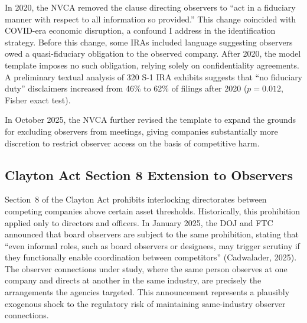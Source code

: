 In 2020, the NVCA removed the clause directing observers to ``act in a fiduciary manner with respect to all information so provided.'' This change coincided with COVID-era economic disruption, a confound I address in the identification strategy. Before this change, some IRAs included language suggesting observers owed a quasi-fiduciary obligation to the observed company. After 2020, the model template imposes no such obligation, relying solely on confidentiality agreements. A preliminary textual analysis of 320 S-1 IRA exhibits suggests that ``no fiduciary duty'' disclaimers increased from 46\% to 62\% of filings after 2020 ($p=0.012$, Fisher exact test).

In October 2025, the NVCA further revised the template to expand the grounds for excluding observers from meetings, giving companies substantially more discretion to restrict observer access on the basis of competitive harm.

\subsection{Clayton Act Section 8 Extension to Observers}

Section~8 of the Clayton Act prohibits interlocking directorates between competing companies above certain asset thresholds. Historically, this prohibition applied only to directors and officers. In January 2025, the DOJ and FTC announced that board observers are subject to the same prohibition, stating that ``even informal roles, such as board observers or designees, may trigger scrutiny if they functionally enable coordination between competitors'' (Cadwalader, 2025). The observer connections under study, where the same person observes at one company and directs at another in the same industry, are precisely the arrangements the agencies targeted. This announcement represents a plausibly exogenous shock to the regulatory risk of maintaining same-industry observer connections.